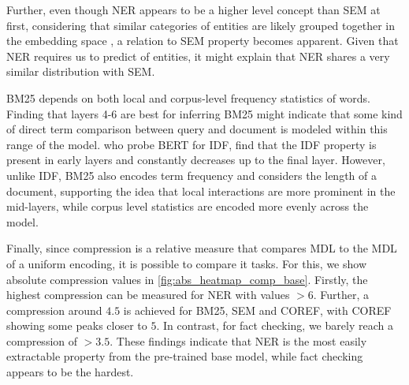 Further, even though NER appears to be a higher level concept than SEM at first, considering that similar categories of entities are likely grouped together in the embedding space \cite{DBLP:journals/corr/abs-1301-3781, pennington2014glove}, a relation to SEM property becomes apparent. Given that NER requires us to predict  of entities, it might explain that NER shares a very similar distribution with SEM.

BM25 depends on both local and corpus-level frequency statistics of words. Finding that layers 4-6 are best for inferring BM25 might indicate that some kind of direct term comparison between query and document is modeled within this range of the model. \cite{https://doi.org/10.48550/arxiv.2202.12191} who probe BERT for IDF, find that the IDF property is present in early layers and constantly decreases up to the final layer. However, unlike IDF, BM25 also encodes term frequency and considers the length of a document, supporting the idea that local interactions are more prominent in the mid-layers, while corpus level statistics are encoded more evenly across the model.

Finally, since compression is a relative measure that compares MDL to the MDL of a uniform encoding, it is possible to compare it  tasks. For this, we show absolute compression values in \autoref{fig:abs_heatmap_comp_base}. Firstly, the highest compression can be measured for NER with values $>6$. Further, a compression around $4.5$ is achieved for BM25, SEM and COREF, with COREF showing some peaks closer to $5$. In contrast, for fact checking, we barely reach a compression of $>3.5$. These findings indicate that NER is the most easily extractable property from the pre-trained base model, while fact checking appears to be the hardest.

